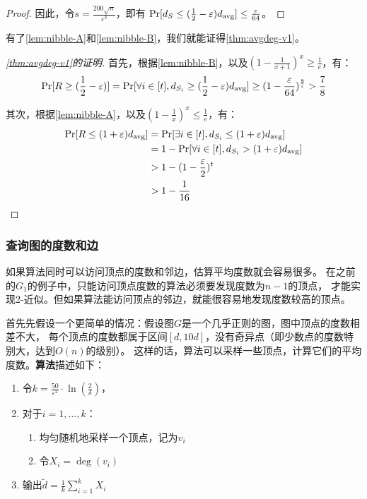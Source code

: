 \begin{proof}
    因此，令$s=\frac{200\sqrt{n}}{\varepsilon^3}$，即有
    $\Pr[d_S\le(\frac{1}{2}-\varepsilon)d_{\mathrm{avg}}]\le\frac{\varepsilon}{64}$。
\end{proof}

有了\cref{lem:nibble-A}和\cref{lem:nibble-B}，我们就能证得\cref{thm:avgdeg-v1}。

\begin{proof}[\cref{thm:avgdeg-v1}的证明]
    首先，根据\cref{lem:nibble-B}，以及$(1-\frac{1}{x+1})^x\ge\frac{1}{e}$，有：
    \[
    \Pr[R\ge(\frac{1}{2}-\varepsilon)]=\Pr[\forall i\in[t],d_{S_i}\ge(\frac12-\varepsilon)d_{\mathrm{avg}}]
    \ge(1-\frac{\varepsilon}{64})^{\frac{8}{\varepsilon}}>\frac{7}{8}
    \]

    其次，根据\cref{lem:nibble-A}，以及$(1-\frac{1}{x})^x\le\frac{1}{e}$，有：
    \begin{align*}
        \Pr[R\le(1+\varepsilon)d_{\mathrm{avg}}]&=\Pr[\exists i\in[t], d_{S_i}\le(1+\varepsilon)d_{\mathrm{avg}}]\\
        &=1-\Pr[\forall i\in[t], d_{S_i}>(1+\varepsilon)d_{\mathrm{avg}}]\\
        &>1-(1-\frac{\varepsilon}{2})^t\\
        &>1-\frac{1}{16}
        \end{align*}
\end{proof}


\subsubsection{查询图的度数和边}
如果算法同时可以访问顶点的度数和邻边，估算平均度数就会容易很多。
在之前的$G_1$的例子中，只能访问顶点度数的算法必须要发现度数为$n-1$的顶点，
才能实现2-近似。但如果算法能访问顶点的邻边，就能很容易地发现度数较高的顶点。

首先先假设一个更简单的情况：假设图$G$是一个几乎正则的图，图中顶点的度数相差不大，
每个顶点的度数都属于区间$[d,10d]$，没有奇异点（即少数点的度数特别大，达到$O(n)$的级别）。
这样的话，算法可以采样一些顶点，计算它们的平均度数。\textbf{算法}描述如下：

\begin{enumerate}
    \item 令$k=\frac{50}{\varepsilon^2}\cdot\ln(\frac{2}{\delta})$，
    \item 对于$i=1,\dots,k$：
    \begin{enumerate}
        \item[2.1] 均匀随机地采样一个顶点，记为$v_i$
        \item[2.2] 令$X_i=\deg(v_i)$
    \end{enumerate}
    \item 输出$\tilde{d}=\frac{1}{k}\sum_{i=1}^kX_i$
\end{enumerate}

